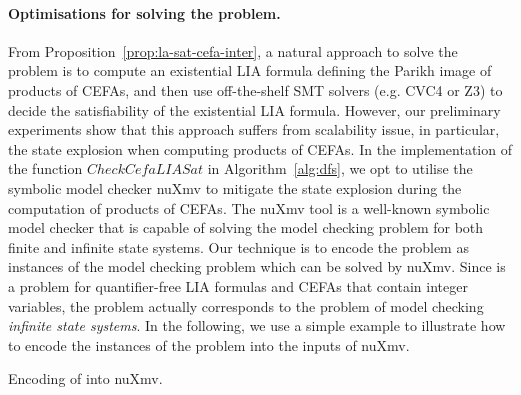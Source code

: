 \paragraph*{Optimisations for solving the {\lasat} problem.} From Proposition~\ref{prop:la-sat-cefa-inter}, a natural approach to solve the {\lasat} problem is to compute an existential LIA formula defining the Parikh image of products of CEFAs, and then use off-the-shelf SMT solvers (e.g. CVC4 or Z3) to decide the satisfiability of the existential LIA formula. %
However, our preliminary experiments show that this approach suffers from scalability issue, in particular, %
the state explosion when computing products of CEFAs.  %
In the implementation of the function $\mathit{CheckCefaLIASat}$ in Algorithm~\ref{alg:dfs},  we %
opt to utilise the symbolic model checker nuXmv \cite{nuxmv} to mitigate the state explosion during the computation of products of CEFAs. The nuXmv tool is a well-known symbolic model checker that is capable of solving the model checking problem for both finite and infinite state systems. Our technique is to encode the {\lasat} problem as instances of the model checking problem which can  be solved by %
nuXmv. Since  {\lasat} is a problem for quantifier-free LIA formulas and CEFAs that contain integer variables, the {\lasat} problem actually corresponds to the problem of model checking \emph{infinite state systems}. In the following, we use a simple example to illustrate how to encode the instances of  the {\lasat} problem into the inputs of nuXmv.

\begin{example}
Encoding of {\lasat} into nuXmv.
\end{example}


